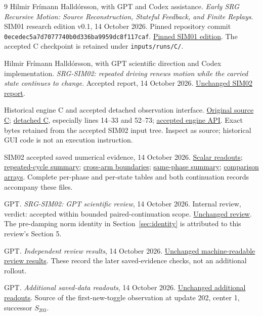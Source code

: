 \documentclass[11pt,a4paper]{article}
\begin{document}
\begin{thebibliography}{9}
 Hilmir Fr\'imann Halld\'orsson, with GPT and Codex assistance.
\emph{Early SRG Recursive Motion: Source Reconstruction, Stateful Feedback, and Finite Replays}. SIM01 research edition v0.1, 14 October 2026. Pinned repository commit \texttt{0ecedec5a7d7077740b0d336ba9959dc8f117caf}.
\href{https://github.com/pzychozen/trioctagon-physics/blob/0ecedec5a7d7077740b0d336ba9959dc8f117caf/SRG_REDISCOVERY/SIM01_SURVIVING_RECURSIVE_MOTION/publication/v0.1/README.md}{Pinned SIM01 edition}. The accepted C checkpoint is retained under \texttt{inputs/runs/C/}.

 Hilmir Fr\'imann Halld\'orsson, with GPT scientific direction and Codex implementation.
\emph{SRG-SIM02: repeated driving renews motion while the carried state continues to change}. Accepted report, 14 October 2026.
\href{SIM02_REPORT.md}{Unchanged SIM02 report}.

 Historical engine C and accepted detached observation interface.
\href{inputs/sources/source_C.py}{Original source C}; \href{inputs/detached/engine_C.py}{detached C}, especially lines 14--33 and 52--73; \href{inputs/engine_api.py}{accepted engine API}. Exact bytes retained from the accepted SIM02 input tree. Inspect as source; historical GUI code is not an execution instruction.

 SIM02 accepted saved numerical evidence, 14 October 2026.
\href{analysis/scalar_readouts.csv}{Scalar readouts}; \href{analysis/repeated_cycle_summary.csv}{repeated-cycle summary}; \href{analysis/cross_arm_boundaries.csv}{cross-arm boundaries}; \href{analysis/same_phase_summary.csv}{same-phase summary}; \href{analysis/comparison_arrays.npz}{comparison arrays}. Complete per-phase and per-state tables and both continuation records accompany these files.

 GPT. \emph{SRG-SIM02: GPT scientific review}, 14 October 2026. Internal review, verdict: accepted within bounded paired-continuation scope.
\href{review/SIM02_GPT_SCIENTIFIC_REVIEW.md}{Unchanged review}. The pre-damping norm identity in Section~\ref{sec:identity} is attributed to this review's Section 5.

 GPT. \emph{Independent review results}, 14 October 2026.
\href{review/INDEPENDENT_REVIEW_RESULTS.json}{Unchanged machine-readable review results}. These record the later saved-evidence checks, not an additional rollout.

 GPT. \emph{Additional saved-data readouts}, 14 October 2026.
\href{review/ADDITIONAL_READOUTS.json}{Unchanged additional readouts}. Source of the first-new-toggle observation at update 202, center 1, successor $S_{203}$.
\end{thebibliography}
\end{document}
